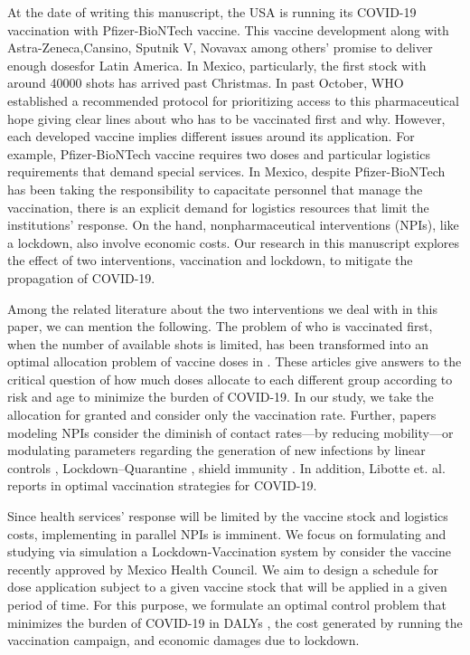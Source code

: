 At the date of writing this manuscript, the USA is running its COVID-19 
vaccination with Pfizer-BioNTech vaccine. This vaccine development along with 
Astra-Zeneca,Cansino, Sputnik V, Novavax among others' promise to deliver 
enough dosesfor Latin America. In Mexico, particularly, the first stock with 
around \num{40 000} shots has arrived past Christmas. In past October, WHO 
established a recommended protocol for prioritizing access to this
pharmaceutical hope giving clear lines about who has to be vaccinated first
and why. However, each developed vaccine implies different issues around its
application. For example, Pfizer-BioNTech vaccine requires two doses and
particular logistics requirements that demand special services. In
Mexico, despite Pfizer-BioNTech has been taking the responsibility to 
capacitate personnel that manage the vaccination, there is an explicit demand 
for logistics resources that limit the institutions' response. On the hand, 
nonpharmaceutical interventions (NPIs), like a lockdown, also involve economic 
costs.  Our research in this manuscript explores the effect of two 
interventions, vaccination and lockdown, to mitigate the  propagation of 
COVID-19.


Among the related literature about the two interventions we deal with in this 
paper, we can mention the following. The problem of who is vaccinated first, 
when the number of  available shots is limited, has been transformed into an 
optimal allocation problem of vaccine doses in \cite{Bubar2020,Matrajt2020}.  
These articles give answers to the critical question of how much doses 
allocate to each different group according to risk and age to minimize the 
burden of COVID-19. In our study, we take the allocation for granted and 
consider only the vaccination rate. 
Further, papers modeling NPIs consider the diminish of contact rates---by
reducing mobility---or modulating parameters regarding the generation of new
infections by linear controls \cite{Naraigh2020,Ullah2020},
Lockdown--Quarantine \cite{Mandal2020},  shield immunity
\cite{Weitz2020}. In addition, Libotte et. al. reports in \cite{Libotte2020} 
optimal vaccination strategies for COVID-19. 

    Since health services' response will be limited by the vaccine stock
and logistics costs, implementing in parallel NPIs is imminent. We focus on
formulating and studying via simulation a Lockdown-Vaccination system by 
consider the vaccine recently approved by  Mexico Health Council.     We aim to 
design a schedule for dose application subject to a given vaccine stock that 
will be applied in a given period of time. For this purpose, we formulate an 
optimal control problem that minimizes the burden of  COVID-19 in DALYs 
\cite{WhoDALY}, the cost generated by   running the vaccination 
campaign, and economic damages due to lockdown.

